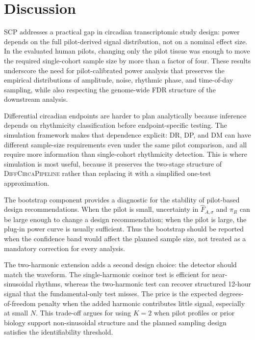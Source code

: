 \documentclass{article}
\begin{document}


\section{Discussion}

\textsc{SCP} addresses a practical gap in circadian transcriptomic study
design: power depends on the full pilot-derived signal distribution, not
on a nominal effect size. In the evaluated human pilots, changing only the
pilot tissue was enough to move the required single-cohort sample size by
more than a factor of four. These results underscore the need for
pilot-calibrated power analysis that preserves the empirical distributions
of amplitude, noise, rhythmic phase, and time-of-day sampling, while also
respecting the genome-wide FDR structure of the downstream analysis.


Differential circadian endpoints are harder to plan analytically because
inference depends on rhythmicity classification before endpoint-specific
testing. The simulation framework makes that dependence explicit: DR, DP,
and DM can have different sample-size requirements even under the same
pilot comparison, and all require more information than single-cohort
rhythmicity detection. This is where simulation is most useful, because it
preserves the two-stage structure of \textsc{DiffCircaPipeline} rather
than replacing it with a simplified one-test approximation.

The bootstrap component provides a diagnostic for the stability of
pilot-based design recommendations. When the pilot is small, uncertainty
in $\hat{F}_{A,\sigma}$ and $\hat{\pi}_R$ can be large enough to change a
design recommendation; when the pilot is large, the plug-in power curve is
usually sufficient. Thus the bootstrap should be reported when the
confidence band would affect the planned sample size, not treated as a
mandatory correction for every analysis.

The two-harmonic extension adds a second design choice: the detector
should match the waveform. The single-harmonic cosinor test is efficient
for near-sinusoidal rhythms, whereas the two-harmonic test can recover
structured 12-hour signal that the fundamental-only test misses. The price
is the expected degrees-of-freedom penalty when the added harmonic
contributes little signal, especially at small $N$. This trade-off argues
for using $K=2$ when pilot profiles or prior biology support
non-sinusoidal structure and the planned sampling design satisfies the
identifiability threshold.
\end{document}
